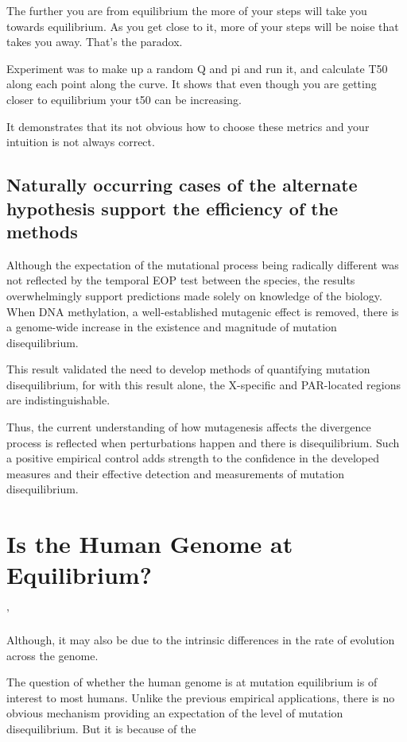 The further you are from equilibrium the more of your steps will take you towards equilibrium.  As you get close to it, more of your steps will be noise that takes you away. That's the paradox. 

Experiment was to make up a random Q and pi and run it, and calculate T50 along each point along the curve. It shows that even though you are getting closer to equilibrium your t50 can be increasing. 

It demonstrates that its not obvious how to choose these metrics and your intuition is not always correct. 


\subsection*{Naturally occurring cases of the alternate hypothesis support the efficiency of the methods}


Although the expectation of the mutational process being radically different was not reflected by the temporal EOP test between the species, the results overwhelmingly support predictions made solely on knowledge of the biology. When DNA methylation, a well-established mutagenic effect is removed, there is a genome-wide increase in the existence and magnitude of mutation disequilibrium. 

This result validated the need to develop methods of quantifying mutation disequilibrium, for with this result alone, the X-specific and PAR-located regions are indistinguishable.

Thus, the current understanding of how mutagenesis affects the divergence process is reflected when perturbations happen and there is disequilibrium. Such a positive empirical control adds strength to the confidence in the developed measures and their effective detection and measurements of mutation disequilibrium. 

\section{Is the Human Genome at Equilibrium?}
'

Although, it may also be due to the intrinsic differences in the rate of evolution across the genome.

The question of whether the human genome is at mutation equilibrium is of interest to most humans. Unlike the previous empirical applications, there is no obvious mechanism providing an expectation of the level of mutation disequilibrium. But it is because of the 


